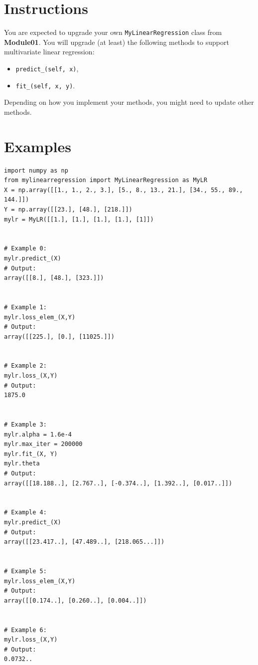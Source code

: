 \documentclass{42-en}
\begin{document}
\section*{Instructions}
You are expected to upgrade your own \texttt{MyLinearRegression} class from \textbf{Module01}.
You will upgrade (at least) the following methods to support multivariate linear regression:
\begin{itemize}
  \item \texttt{predict\_(self, x)}, 
  \item \texttt{fit\_(self, x, y)}.
\end{itemize}
Depending on how you implement your methods, you might need to update other methods.

\section*{Examples}
\begin{verbatim}
import numpy as np
from mylinearregression import MyLinearRegression as MyLR
X = np.array([[1., 1., 2., 3.], [5., 8., 13., 21.], [34., 55., 89., 144.]])
Y = np.array([[23.], [48.], [218.]])
mylr = MyLR([[1.], [1.], [1.], [1.], [1]])


# Example 0:
mylr.predict_(X)
# Output:
array([[8.], [48.], [323.]])


# Example 1:
mylr.loss_elem_(X,Y)
# Output:
array([[225.], [0.], [11025.]])


# Example 2:
mylr.loss_(X,Y)
# Output:
1875.0


# Example 3:
mylr.alpha = 1.6e-4
mylr.max_iter = 200000
mylr.fit_(X, Y)
mylr.theta
# Output:
array([[18.188..], [2.767..], [-0.374..], [1.392..], [0.017..]])


# Example 4:
mylr.predict_(X)
# Output:
array([[23.417..], [47.489..], [218.065...]])


# Example 5:
mylr.loss_elem_(X,Y)
# Output:
array([[0.174..], [0.260..], [0.004..]])


# Example 6:
mylr.loss_(X,Y)
# Output:
0.0732..
\end{verbatim}


\newpage
\end{document}
